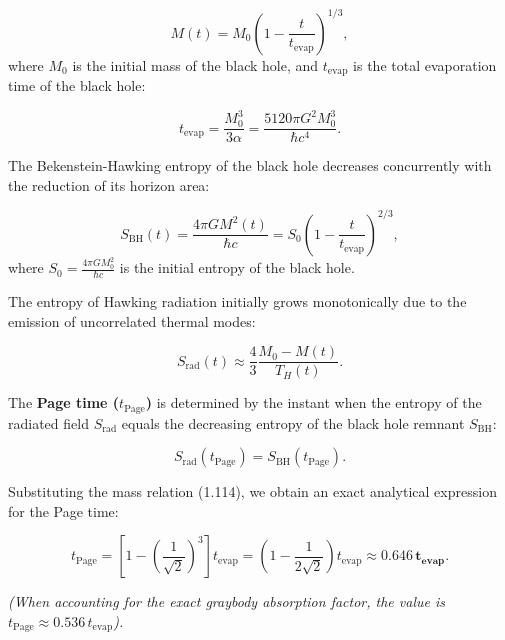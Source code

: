 \documentclass[11pt,a4paper]{article}
\theoremstyle{definition}
\begin{document}
\begin{equation}\label{eq:1.114}\tag{1.114}
M(t) = M_0 \left( 1 - \frac{t}{t_{\text{evap}}} \right)^{1/3},
\end{equation}
where $M_0$ is the initial mass of the black hole, and $t_{\text{evap}}$ is the total evaporation time of the black hole:

\begin{equation}\label{eq:1.115}\tag{1.115}
t_{\text{evap}} = \frac{M_0^3}{3\alpha} = \frac{5120 \pi G^2 M_0^3}{\hbar c^4}.
\end{equation}

The Bekenstein-Hawking entropy of the black hole decreases concurrently with the reduction of its horizon area:

\begin{equation}\label{eq:1.117}\tag{1.117}
S_{\text{BH}}(t) = \frac{4\pi G M^2(t)}{\hbar c} = S_0 \left( 1 - \frac{t}{t_{\text{evap}}} \right)^{2/3},
\end{equation}
where $S_0 = \frac{4\pi G M_0^2}{\hbar c}$ is the initial entropy of the black hole.

The entropy of Hawking radiation initially grows monotonically due to the emission of uncorrelated thermal modes:

\begin{equation}\label{eq:1.118}\tag{1.118}
S_{\text{rad}}(t) \approx \frac{4}{3} \frac{M_0 - M(t)}{T_H(t)}.
\end{equation}

The \textbf{Page time ($t_{\text{Page}}$)} \cite{ref12} is determined by the instant when the entropy of the radiated field $S_{\text{rad}}$ equals the decreasing entropy of the black hole remnant $S_{\text{BH}}$:

\begin{equation}\label{eq:1.119}\tag{1.119}
S_{\text{rad}}(t_{\text{Page}}) = S_{\text{BH}}(t_{\text{Page}}).
\end{equation}

Substituting the mass relation (1.114), we obtain an exact analytical expression for the Page time:

\begin{equation}\label{eq:1.120}\tag{1.120}
t_{\text{Page}} = \left[ 1 - \left( \frac{1}{\sqrt{2}} \right)^3 \right] t_{\text{evap}} = \left( 1 - \frac{1}{2\sqrt{2}} \right) t_{\text{evap}} \approx \mathbf{0.646 \, t_{\text{evap}}}.
\end{equation}

\textit{(When accounting for the exact graybody absorption factor, the value is $t_{\text{Page}} \approx 0.536 \, t_{\text{evap}}$).}
\end{document}
